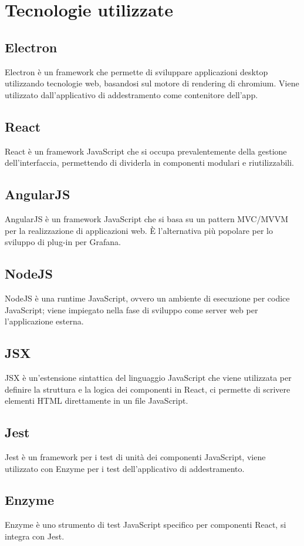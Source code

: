 \section{Tecnologie utilizzate}
	\subsection{Electron}
		Electron è un framework che permette di sviluppare applicazioni desktop utilizzando tecnologie web, basandosi sul motore di rendering di chromium. Viene utilizzato dall'applicativo di addestramento come contenitore dell'app.
	\subsection{React}
		React è un framework JavaScript che si occupa prevalentemente della gestione dell'interfaccia, permettendo di dividerla in componenti modulari e riutilizzabili.
	\subsection{AngularJS}
		AngularJS è un framework JavaScript che si basa su un pattern MVC/MVVM per la realizzazione di applicazioni web. È l'alternativa più popolare per lo sviluppo di plug-in per Grafana\glo.
	\subsection{NodeJS}
		NodeJS è una runtime JavaScript, ovvero un ambiente di esecuzione per codice JavaScript; viene impiegato nella fase di sviluppo come server web per l'applicazione esterna.
	\subsection{JSX}
		JSX è un'estensione sintattica del linguaggio JavaScript che viene utilizzata per definire la struttura e la logica dei componenti in React, ci permette di scrivere elementi HTML direttamente in un file JavaScript.
	\subsection{Jest}
		Jest è un framework per i test di unità dei componenti JavaScript, viene utilizzato con Enzyme per i test dell'applicativo di addestramento.
	\subsection{Enzyme}
		Enzyme è uno strumento di test JavaScript specifico per componenti React, si integra con Jest.
